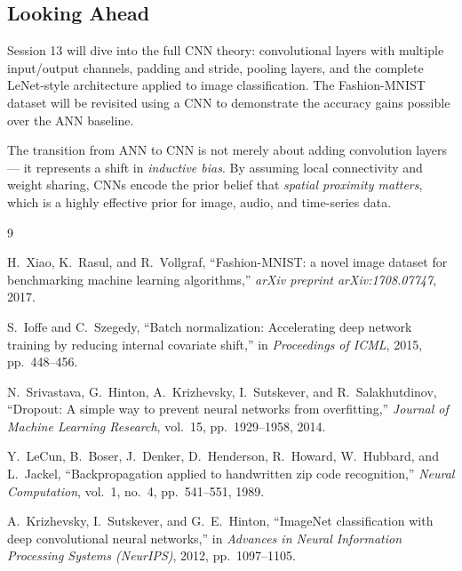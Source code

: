 \documentclass[12pt,a4paper]{article}
\begin{document}
\subsection{Looking Ahead}
\label{sec:summary:ahead}

Session 13 will dive into the full CNN theory: convolutional layers with
multiple input/output channels, padding and stride, pooling layers, and the
complete LeNet-style architecture applied to image classification.  The
Fashion-MNIST dataset will be revisited using a CNN to demonstrate the
accuracy gains possible over the ANN baseline.

\begin{keyinsight}
  The transition from ANN to CNN is not merely about adding convolution layers
  --- it represents a shift in \emph{inductive bias}.  By assuming local
  connectivity and weight sharing, CNNs encode the prior belief that
  \emph{spatial proximity matters}, which is a highly effective prior for
  image, audio, and time-series data.
\end{keyinsight}

\begin{thebibliography}{9}

H.\ Xiao, K.\ Rasul, and R.\ Vollgraf,
``Fashion-MNIST: a novel image dataset for benchmarking machine learning
  algorithms,''
\textit{arXiv preprint arXiv:1708.07747}, 2017.

S.\ Ioffe and C.\ Szegedy,
``Batch normalization: Accelerating deep network training by reducing
  internal covariate shift,''
in \textit{Proceedings of ICML}, 2015, pp.\ 448--456.

N.\ Srivastava, G.\ Hinton, A.\ Krizhevsky, I.\ Sutskever, and R.\ Salakhutdinov,
``Dropout: A simple way to prevent neural networks from overfitting,''
\textit{Journal of Machine Learning Research}, vol.\ 15, pp.\ 1929--1958, 2014.

Y.\ LeCun, B.\ Boser, J.\ Denker, D.\ Henderson, R.\ Howard, W.\ Hubbard,
and L.\ Jackel,
``Backpropagation applied to handwritten zip code recognition,''
\textit{Neural Computation}, vol.\ 1, no.\ 4, pp.\ 541--551, 1989.

A.\ Krizhevsky, I.\ Sutskever, and G.\ E.\ Hinton,
``ImageNet classification with deep convolutional neural networks,''
in \textit{Advances in Neural Information Processing Systems (NeurIPS)},
2012, pp.\ 1097--1105.

\end{thebibliography}

\clearpage
\end{document}
